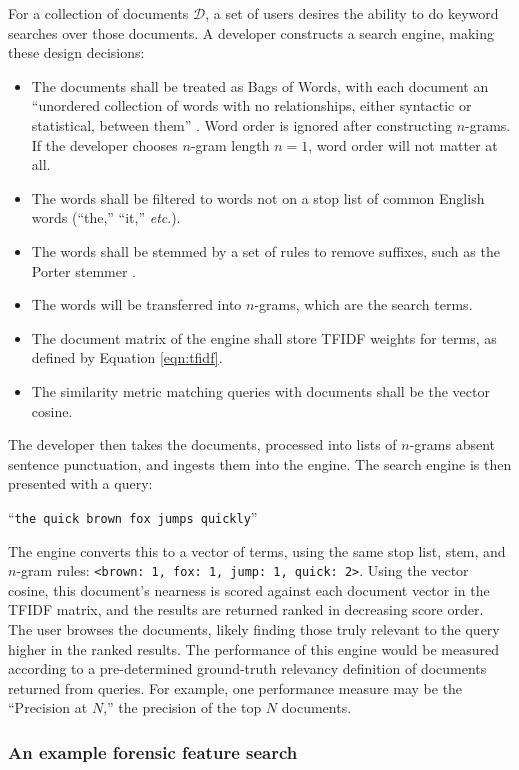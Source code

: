 \documentclass[11pt]{ucthesis}
\theoremstyle{plain}
\theoremstyle{definition}
\newcommand{\etc}{\emph{etc}\xspace}
\begin{document}
For a collection of documents $\mathcal{D}$, a set of users desires the ability to do keyword searches over those documents.  A developer constructs a search engine, making these design decisions:

\begin{itemize}
\item The documents shall be treated as Bags of Words, with each document an ``unordered collection of words with no relationships, either syntactic or statistical, between them'' \cite{croft:addison-wesley10}.  Word order is ignored after constructing $n$-grams.  If the developer chooses $n$-gram length $n=1$, word order will not matter at all.
\item The words shall be filtered to words not on a stop list of common English words (``the,'' ``it,'' \etc.).
\item The words shall be stemmed by a set of rules to remove suffixes, such as the Porter stemmer \cite{porter:program80}.
\item The words will be transferred into $n$-grams, which are the search terms.
\item The document matrix of the engine shall store TFIDF weights for terms, as defined by Equation \ref{eqn:tfidf}.
\item The similarity metric matching queries with documents shall be the vector cosine.
\end{itemize}

The developer then takes the documents, processed into lists of $n$-grams absent sentence punctuation, and ingests them into the engine.  The search engine is then presented with a query:

``\texttt{the quick brown fox jumps quickly}''

The engine converts this to a vector of terms, using the same stop list, stem, and $n$-gram rules: \texttt{<brown: 1, fox: 1, jump: 1, quick: 2>}.  Using the vector cosine, this document's nearness is scored against each document vector in the TFIDF matrix, and the results are returned ranked in decreasing score order.  The user browses the documents, likely finding those truly relevant to the query higher in the ranked results.  The performance of this engine would be measured according to a pre-determined ground-truth relevancy definition of documents returned from queries.  For example, one performance measure may be the ``Precision at $N$,'' the precision of the top $N$ documents.


\subsubsection{An example forensic feature search}
\end{document}

